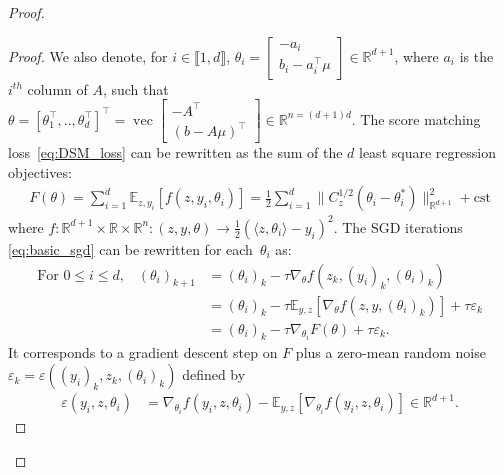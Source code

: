\documentclass[11pt]{article}
\newcommand{\dotp}[2]{\langle #1, #2 \rangle}
\newcommand{\RR}{\mathbb{R}}
\newcommand{\EE}{\mathbb{E}}
\begin{document}
\begin{proof}
\begin{proof}
We also denote, for $i \in \llbracket 1, d \rrbracket$,  $\theta_i =
\begin{bmatrix}
-a_i \\ b_i - a_i^\top \mu
\end{bmatrix} \in \RR^{d+1}$, where $a_i$ is the $i^{th}$ column of $A$, such that ${\theta = [\theta_1^\top, .., \theta_d^\top]^\top  =\operatorname{vec} \begin{bmatrix} -A^\top \\ (b - A \mu)^\top \end{bmatrix} \in \mathbb{R}^{n = (d+1)d}}$. The score matching loss~\eqref{eq:DSM_loss} can be rewritten as the sum of the $d$ least square regression objectives:
\begin{align*}
    F(\theta) =  \sum_{i=1}^d    \mathbb{E}_{z, y_i} \left[ f(z, y_i, \theta_i) \right] 
    = \frac{1}{2} \sum_{i=1}^d  \|  C_z^{1/2}( \theta_i - \theta_i^*) \|_{\RR^{d+1}}^2 + \text{cst}
\end{align*}
where $f : \RR^{d+1} \times \RR \times \RR^n : (z, y, \theta) \to \frac{1}{2}( \dotp{z}{\theta_i} - y_i )^2$.
The SGD iterations \eqref{eq:basic_sgd} can be rewritten for each~$\theta_i$ as: 
\begin{align}
\text{For $0 \leq i \leq d$,} \quad (\theta_i)_{k+1} &= (\theta_i)_k - \tau \nabla_\theta f(z_k, (y_i)_k, (\theta_i)_k) \\
    &=  (\theta_i)_k - \tau \mathbb{E}_{y,z}[\nabla_\theta f(z, y, (\theta_i)_k)] + \tau \varepsilon_k \\
    &= (\theta_i)_k - \tau \nabla_{\theta_i} F(\theta) + \tau \varepsilon_k \label{eq:SGD_general} .
\end{align}
It corresponds to a gradient descent step on $F$ plus a zero-mean random noise $\varepsilon_k =  \varepsilon((y_i)_k, z_k, (\theta_i)_k)$ defined by
\begin{align} \label{eq:eps_fn}
    \varepsilon(y_i, z, \theta_i) &=  \nabla_{\theta_i} f(y_i,z,\theta_i) - \EE_{y, z}[\nabla_{\theta_i} f(y_i,z,\theta_i)] \in \RR^{d+1} .

\end{align}
\end{proof}
\end{proof}
\end{document}

